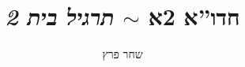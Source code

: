 \documentclass[]{../../../../tex/classes/styledArticle}
\author{שחר פרץ}
\title{חדו''א 2א $\sim$ \textit{תרגיל בית 2}}
\begin{document}
	\maketitle
	
	
	
	
	\ndoc
\end{document}
